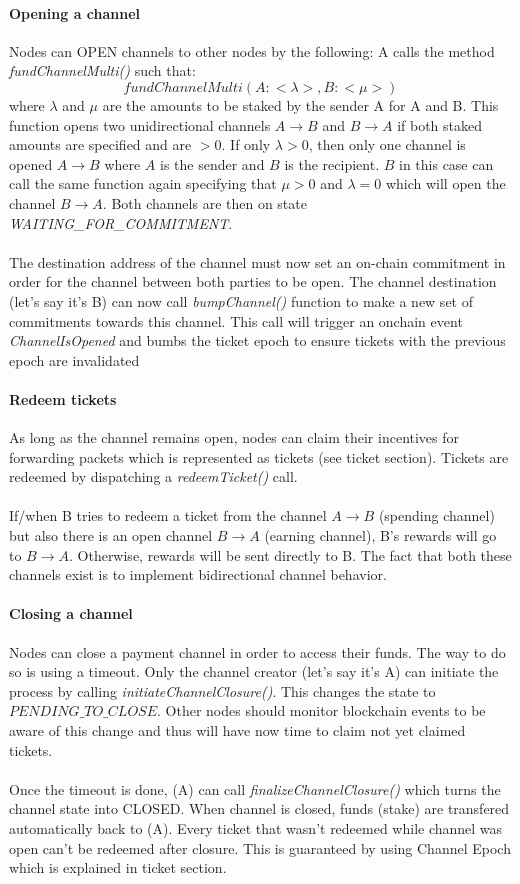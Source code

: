 \paragraph{Opening a channel} Nodes can OPEN channels to other nodes by the following:
A calls the method \textit{fundChannelMulti()} such that:
$$fundChannelMulti(A: <\lambda>, B:<\mu> )$$ where $\lambda$ and $\mu$ are the amounts to be staked by the sender A for A and B. This function opens two unidirectional channels $A\rightarrow B$ and $B\rightarrow A$ if both staked amounts are specified and are $>0$. If only $\lambda>0$,  then only one channel is opened $A\rightarrow B$ where $A$ is the sender and $B$ is the recipient. $B$ in this case can call the same function again specifying that $\mu>0$ and $\lambda=0$ which will open the channel $B\rightarrow A$.
Both channels are then on state \textit{WAITING\_FOR\_COMMITMENT}.
\\~\\The destination address of the channel must now set an on-chain commitment in order for the channel between both parties to be open.
The channel destination (let's say it's B) can now call \textit{bumpChannel()} function to make a new set of commitments towards this channel. This call will trigger an onchain event \textit{ChannelIsOpened} and bumbs the ticket epoch to ensure tickets with the previous epoch are invalidated

\paragraph{Redeem tickets}
As long as the channel remains open, nodes can claim their incentives for forwarding packets which is represented as tickets (see ticket section). Tickets are redeemed by dispatching a \textit{redeemTicket()} call.
\\~\\If/when B tries to redeem a ticket from the channel $A\rightarrow B$ (spending channel) but also there is an open channel $B\rightarrow A$ (earning channel), B's rewards will go to $B\rightarrow A$. Otherwise, rewards will be sent directly to B. The fact that both these channels exist is to implement bidirectional channel behavior.

\paragraph{Closing a channel}
Nodes can close a payment channel in order to access their funds. The way to do so is using a timeout.
Only the channel creator (let's say it's A) can initiate the process by calling \textit{initiateChannelClosure()}. This changes the state to $PENDING\_TO\_CLOSE$. Other nodes should monitor blockchain events to be aware of this change and thus will have now time to claim not yet claimed tickets.
\\~\\Once the timeout is done, (A) can call \textit{finalizeChannelClosure()} which turns the channel state into CLOSED. When channel is closed, funds (stake) are transfered automatically back to (A). Every ticket that wasn't redeemed while channel was open can't be redeemed after closure. This is guaranteed by using Channel Epoch which is explained in ticket section.

